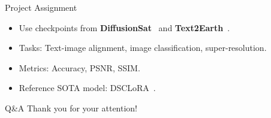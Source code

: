 \begin{refsection}
\begin{frame}{Project Assignment}
  \begin{itemize}
    \item Use checkpoints from \textbf{DiffusionSat}~\parencite{diffusionset2024} and \textbf{Text2Earth}~\parencite{text2earth2025}.
    \item Tasks: Text-image alignment, image classification, super-resolution.
    \item Metrics: Accuracy, PSNR, SSIM.
    \item Reference SOTA model: DSCLoRA~\parencite{Chai2025DistillationSupervisedCL}.
  \end{itemize}
  \bottomleftrefs
\end{frame}
\end{refsection}

\begin{refsection}
\begin{frame}{Q\&A}
  \centering
  Thank you for your attention! \\
\end{frame}
\end{refsection}
